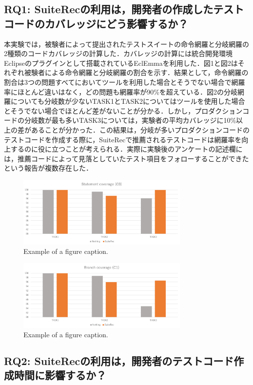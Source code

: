 \documentclass[conference]{IEEEtran}
\begin{document}
\subsection{RQ1: SuiteRecの利用は，開発者の作成したテストコードのカバレッジにどう影響するか？}
本実験では，被験者によって提出されたテストスイートの命令網羅と分岐網羅の2種類のコードカバレッジの計算した．カバレッジの計算には統合開発環境Eclipseのプラグインとして搭載されているEclEmmaを利用した．図1と図2はそれぞれ被験者による命令網羅と分岐網羅の割合を示す．結果として，命令網羅の割合は3つの問題すべてにおいてツールを利用した場合とそうでない場合で網羅率にほとんど違いはなく，どの問題も網羅率が90\%を超えている．図2の分岐網羅についても分岐数が少ないTASK1とTASK2についてはツールを使用した場合とそうでない場合でほとんど差がないことが分かる．しかし，プロダクションコードの分岐数が最も多いTASK3については，実験者の平均カバレッジに10\%以上の差があることが分かった．この結果は，分岐が多いプロダクションコードのテストコードを作成する際に，SuiteRecで推薦されるテストコードは網羅率を向上するのに役に立つことが考えられる．実際に実験後のアンケートの記述欄には，推薦コードによって見落としていたテスト項目をフォローすることができたという報告が複数存在した．
\begin{figure}[htbp]
\centerline{\includegraphics[width=8.5cm]{C0.pdf}}
\caption{Example of a figure caption.}
\label{fig}
\end{figure}

\begin{figure}[htbp]
\centerline{\includegraphics[width=8.5cm]{C1.pdf}}
\caption{Example of a figure caption.}
\label{fig}
\end{figure}

\subsection{RQ2: SuiteRecの利用は，開発者のテストコード作成時間に影響するか？}
\end{document}
